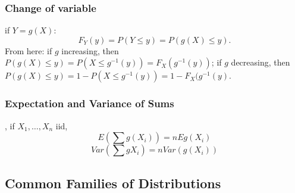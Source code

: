 \documentclass[12pt]{amsart}
\numberwithin{equation}{section}
\theoremstyle{plain}
\theoremstyle{definition}
\begin{document}
\subsubsection{Change of variable} if $Y=g(X)$:
$$
F_Y(y) = P(Y\leq y) = P(g(X)\leq y).
$$
From here: if $g$ increasing, then $P(g(X)\leq y) = P(X\leq g^{-1}(y))=F_X(g^{-1}(y))$; if $g$ decreasing, then $P(g(X)\leq y) = 1-P(X\leq g^{-1}(y))=1-F_X(g^{-1}(y)$.

\subsubsection{Expectation and Variance of Sums}, if $X_1,\ldots, X_n$ iid,
$$
E(\sum g(X_i)) = nEg(X_i)
$$
$$
Var(\sum g{X_i})=nVar(g(X_i))
$$

\subsection{Common Families of Distributions}
\end{document}
